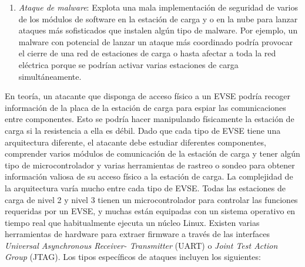 \documentclass[12pt,a4paper,onecolumn,oneside]{report}
\newcounter{subsubsubsection}[subsubsection]
\begin{document}
\begin{enumerate}
\item \textit{Ataque de malware}: Explota una mala implementación de seguridad de varios de los módulos de software en la estación de carga y o en la nube para lanzar ataques más sofisticados que instalen algún tipo de malware. Por ejemplo, un malware con potencial de lanzar un ataque más coordinado podría provocar el cierre de una red de estaciones de carga o hasta afectar a toda la red eléctrica porque se podrían activar varias estaciones de carga simultáneamente.

\end{enumerate}




En teoría, un atacante que disponga de acceso físico a un EVSE podría recoger información de la placa de la estación de carga para espiar las comunicaciones entre componentes. Esto se podría hacer manipulando físicamente la estación de carga si la resistencia a ella es débil. Dado que cada tipo de EVSE tiene una arquitectura diferente, el atacante debe estudiar diferentes componentes, comprender varios módulos de comunicación de la estación de carga y tener algún tipo de microcontrolador y varias herramientas de rastreo o sondeo para obtener información valiosa de su acceso físico a la estación de carga. La complejidad de la arquitectura varía mucho entre cada tipo de EVSE. Todas las estaciones de carga de nivel 2 y nivel 3 tienen un microcontrolador para controlar las funciones requeridas por un EVSE, y muchas están equipadas con un sistema operativo en tiempo real que habitualmente ejecuta un núcleo Linux. Existen varias herramientas de hardware para extraer firmware a través de las interfaces \textit{Universal Asynchronous Receiver- Transmitter} (UART) o \textit{Joint Test Action Group} (JTAG). Los tipos específicos de ataques incluyen los siguientes:
\end{document}

